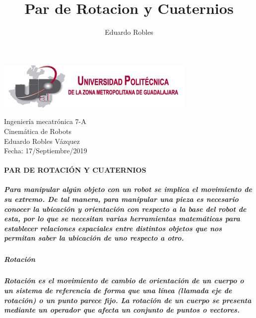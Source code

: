 \documentclass[12pt,a4paper]{report}
\author{Eduardo Robles}
\title{Par de Rotacion y Cuaternios}
\begin{document}
\begin{center}
\includegraphics[scale=1]{logo.png}  
\end{center}
\begin{flushright}

Ingeniería mecatrónica 7-A\\
Cinemática de Robots \\
Eduardo Robles Vázquez\\
Fecha: 17/Septiembre/2019\\
\end{flushright}
\paragraph{PAR DE ROTACIÓN Y CUATERNIOS}

\subparagraph{Para manipular algún objeto con un robot se implica el movimiento de su extremo. De tal manera, para manipular una pieza es necesario conocer la ubicación y orientación con respecto a la base del robot de esta, por lo que se necesitan varias herramientas matemáticas para establecer relaciones espaciales entre distintos objetos que nos permitan saber la ubicación de uno respecto a otro.}


\subparagraph{Rotación }
\subparagraph{Rotación es el movimiento de cambio de orientación de un cuerpo o un sistema de referencia de forma que una línea (llamada eje de rotación) o un punto parece fijo. La rotación de un cuerpo se presenta mediante un operador que afecta un conjunto de puntos o vectores.}
\end{document}
